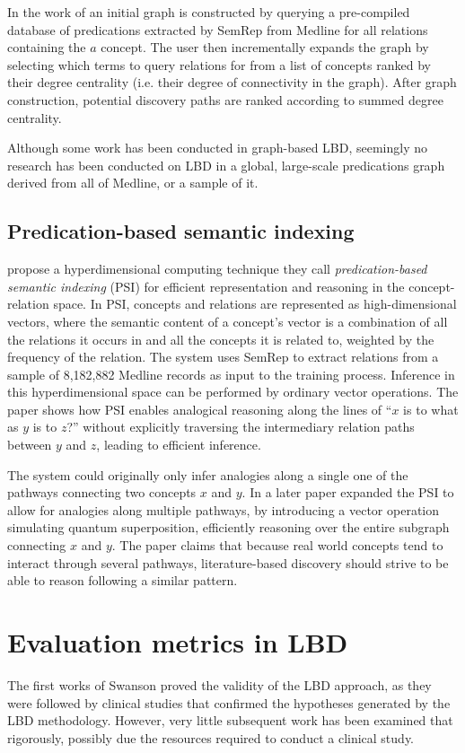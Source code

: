 In the work of \citet{wil11} an initial graph is constructed by querying a pre-compiled database of predications extracted by SemRep from Medline for all relations containing the $a$ concept. The user then incrementally expands the graph by selecting which terms to query relations for from a list of concepts ranked by their degree centrality (i.e. their degree of connectivity in the graph). After graph construction, potential discovery paths are ranked according to summed degree centrality. 

Although some work has been conducted in graph-based LBD, seemingly no research has been conducted on LBD in a global, large-scale predications graph derived from all of Medline, or a sample of it.

\subsection{Predication-based semantic indexing}
\citet{coh12a} propose a hyperdimensional computing technique they call \emph{predication-based semantic indexing} (PSI) for efficient representation and reasoning in the concept-relation space. In PSI, concepts and relations are represented as high-dimensional vectors, where the semantic content of a concept's vector is a combination of all the relations it occurs in and all the concepts it is related to, weighted by the frequency of the relation. The system uses SemRep to extract relations from a sample of 8,182,882 Medline records as input to the training process. Inference in this hyperdimensional space can be performed by ordinary vector operations. The paper shows how PSI enables analogical reasoning along the lines of ``$x$ is to what as $y$ is to $z$?'' without explicitly traversing the intermediary relation paths between $y$ and $z$, leading to efficient inference. 

The system could originally only infer analogies along a single one of the pathways connecting two concepts $x$ and $y$. In a later paper \citet{coh12b} expanded the PSI to allow for analogies along multiple pathways, by introducing a vector operation simulating quantum superposition, efficiently reasoning over the entire subgraph connecting $x$ and $y$. The paper claims that because real world concepts tend to interact through several pathways, literature-based discovery should strive to be able to reason following a similar pattern.

\section{Evaluation metrics in LBD}
The first works of Swanson proved the validity of the LBD approach, as they were followed by clinical studies that confirmed the hypotheses generated by the LBD methodology. However, very little subsequent work has been examined that rigorously, possibly due the resources required to conduct a clinical study. 

